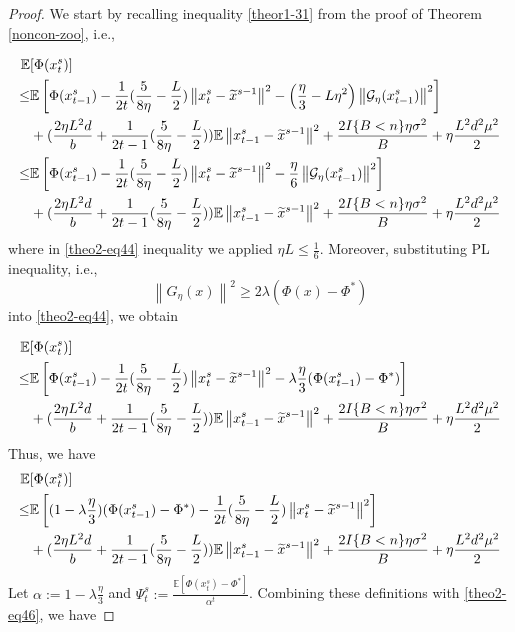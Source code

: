 \documentclass{article}
\newcommand*{\G}{\mathcal{G}}
\newcommand*{\E}{\mathbb{E}}
\newcommand{\norm}[1]{\left\lVert#1\right\rVert}
\theoremstyle{definition}
\theoremstyle{remark}
\begin{document}
\begin{proof}
We start by recalling inequality \eqref{theor1-31} from the proof of Theorem \ref{noncon-zoo}, i.e.,

{\color{Brown}
\begin{align} 
\E&[\Phi({x}_{t}^s)] \notag
\\ \leq& \E\left[\Phi({x}_{t-1}^s)  -\frac{1}{2t}(\frac{5}{8\eta} - \frac{L}{2})\norm{{x}_t^s-\widetilde{x}^{s-1}}^2- \left(\frac{\eta}{3}-L\eta^2\right)\norm{\G_{\eta}(x_{t-1}^s)}^2\right]\notag\\
&+(\frac{2\eta L^2 d}{b}+\frac{1}{2t-1}(\frac{5}{8\eta} - \frac{L}{2}))\E\norm{x_{t-1}^s-\widetilde{x}^{s-1}}^2
+ \frac{2I\{B < n\}\eta \sigma ^2}{B}+\eta \frac{L^2 d^2 \mu^2}{2}\notag
\\ \leq& \E\left[\Phi({x}_{t-1}^s)  -\frac{1}{2t}(\frac{5}{8\eta} - \frac{L}{2})\norm{{x}_t^s-\widetilde{x}^{s-1}}^2- \frac{\eta}{6}\norm{\G_{\eta}(x_{t-1}^s)}^2\right]\notag\\
&+(\frac{2\eta L^2 d}{b}+\frac{1}{2t-1}(\frac{5}{8\eta} - \frac{L}{2}))\E\norm{x_{t-1}^s-\widetilde{x}^{s-1}}^2
+ \frac{2I\{B < n\}\eta \sigma ^2}{B}+\eta \frac{L^2 d^2 \mu^2}{2}\label{theo2-eq44}
 \end{align}
 where in \eqref{theo2-eq44} inequality we applied $\eta L \leq \frac{1}{6}$.
 }
Moreover, substituting PL inequality, i.e., 
\begin{equation}
\norm{G_{\eta}(x)}^2 \geq 2\lambda (\Phi(x) - \Phi^*)
\end{equation}
into \eqref{theo2-eq44}, we obtain

{\color{Brown}
\begin{align} 
\E&[\Phi({x}_{t}^s)] \notag
\\ \leq& \E\left[\Phi({x}_{t-1}^s)  -\frac{1}{2t}(\frac{5}{8\eta} - \frac{L}{2})\norm{{x}_t^s-\widetilde{x}^{s-1}}^2- \lambda\frac{\eta}{3}(\Phi({x}_{t-1}^s) - \Phi^*) \right]\notag\\
&+(\frac{2\eta L^2 d}{b}+\frac{1}{2t-1}(\frac{5}{8\eta} - \frac{L}{2}))\E\norm{x_{t-1}^s-\widetilde{x}^{s-1}}^2
+ \frac{2I\{B < n\}\eta \sigma ^2}{B}+\eta \frac{L^2 d^2 \mu^2}{2}
 \end{align}
 }
Thus, we have
{\color{Brown}
\begin{align} 
\E&[\Phi({x}_{t}^s)] \notag
\\ \leq& \E\left[ (1-\lambda\frac{\eta}{3})(\Phi({x}_{t-1}^s) - \Phi^*)   -\frac{1}{2t}(\frac{5}{8\eta} - \frac{L}{2})\norm{{x}_t^s-\widetilde{x}^{s-1}}^2\right]\notag\\
&+(\frac{2\eta L^2 d}{b}+\frac{1}{2t-1}(\frac{5}{8\eta} - \frac{L}{2}))\E\norm{x_{t-1}^s-\widetilde{x}^{s-1}}^2
+ \frac{2I\{B < n\}\eta \sigma ^2}{B}+\eta \frac{L^2 d^2 \mu^2}{2}\label{theo2-eq46}
 \end{align}
 }
Let {\color{Brown}$\alpha := 1 - \lambda\frac{\eta}{3}$} and $\Psi_t^s := \frac{\E[\Phi({x}_{t}^s)-\Phi^*]}{\alpha^t}$. Combining these definitions with \eqref{theo2-eq46}, we have  


\end{proof}
\end{document}
